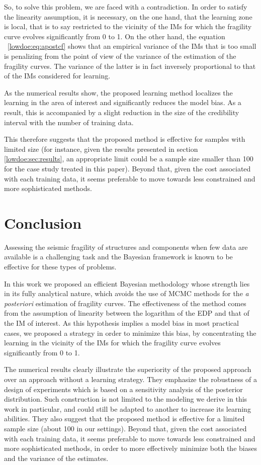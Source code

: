 So, to solve this problem, we are faced with a contradiction. In order to satisfy the linearity assumption, it is necessary, on the one hand, that the learning zone is local, that is to say restricted to the vicinity of the IMs for which the fragility curve evolves significantly from 0 to 1. On the other hand, the equation ~\eqref{lowdoe:eq:apostcf} shows that an empirical variance of the IMs that is too small is penalizing from the point of view of the variance of the estimation of the fragility curves. The variance of the latter is in fact inversely proportional to that of the IMs considered for learning.

As the numerical results show, the proposed learning method localizes the learning in the area of interest and significantly reduces the model bias. As a result, this is accompanied by a slight reduction in the size of the credibility interval with the number of training data.

This therefore suggests that the proposed method is effective for samples
with limited size (for instance, given the results presented in section \ref{lowdoe:sec:results}, an appropriate limit could be a sample size smaller than 100 for the case study treated in this paper). Beyond that, given the cost associated with each training data, it seems preferable to move towards less constrained and more sophisticated methods.

\section{Conclusion}\label{lowdoe:sec:conclusion}

Assessing the seismic fragility of structures and components when few data are available is a challenging task and the Bayesian framework is known to be effective for these types of problems.

In this work we proposed an efficient Bayesian methodology whose strength lies in its fully analytical nature, which avoids the use of MCMC methods for the \emph{a posteriori} estimation of fragility curves.
The effectiveness of the method comes from the assumption of linearity between the logarithm of the EDP and that of the IM of interest. As this hypothesis implies a model bias in most practical cases, we proposed a strategy in order to minimize this bias, by concentrating the learning in the vicinity of the IMs for which the fragility curve evolves significantly from 0 to 1.

The numerical results clearly illustrate the superiority of the proposed approach over an approach without a learning strategy. 
They emphasize the robustness of a design of experiments which is based on a sensitivity analysis of the posterior distribution.
 Such construction is not limited to the modeling we derive in this work in particular, and could still be adapted to another to increase its learning abilities. 
They also suggest that the proposed method is effective for a limited sample size (about 100 in our settings). Beyond that, given the cost associated with each training data, it seems preferable to move towards less constrained and more sophisticated methods, in order to more effectively minimize both the biases and the variance of the estimates.

